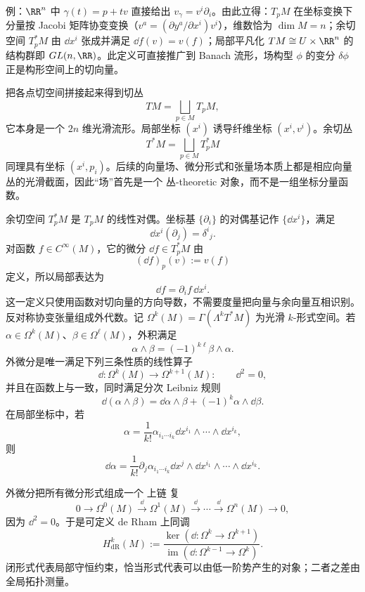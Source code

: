 例：$\RR^n$ 中 $\gamma(t)=p+tv$ 直接给出 $v_\gamma=v^i\partial_i$。由此立得：$T_pM$ 在坐标变换下分量按 Jacobi 矩阵协变变换（$v^a=(\partial y^a/\partial x^i)v^i$），维数恰为 $\dim M=n$；余切空间 $T_p^*M$ 由 $\dd x^i$ 张成并满足 $\dd f(v)=v(f)$；局部平凡化 $TM\cong U\times\RR^n$ 的结构群即 $GL(n,\RR)$。此定义可直接推广到 Banach 流形，场构型 $\phi$ 的变分 $\delta\phi$ 正是构形空间上的切向量。

把各点切空间拼接起来得到切丛
\[
TM=\bigsqcup_{p\in M}T_pM,
\]
它本身是一个 $2n$ 维光滑流形。局部坐标 $(x^i)$ 诱导纤维坐标 $(x^i,v^i)$。余切丛
\[
T^*M=\bigsqcup_{p\in M}T_p^*M
\]
同理具有坐标 $(x^i,p_i)$。后续的向量场、微分形式和张量场本质上都是相应向量丛的光滑截面，因此“场”首先是一个 丛-theoretic 对象，而不是一组坐标分量函数。

余切空间 $T_p^*M$ 是 $T_pM$ 的线性对偶。坐标基 $\{\partial_i\}$ 的对偶基记作 $\{\dd x^i\}$，满足
\[
\dd x^i(\partial_j)=\delta^i{}_j.
\]
对函数 $f\in C^\infty(M)$，它的微分 $\dd f\in T_p^*M$ 由
\begin{equation}\label{eq:math-dg-differential-function}
(\dd f)_p(v):=v(f)
\end{equation}
定义，所以局部表达为
\[
\dd f=\partial_i f\,\dd x^i.
\]
这一定义只使用函数对切向量的方向导数，不需要度量把向量与余向量互相识别。
反对称协变张量组成外代数。记 $\Omega^k(M)=\Gamma(\Lambda^kT^*M)$ 为光滑 $k$-形式空间。若 $\alpha\in\Omega^k(M)$、$\beta\in\Omega^\ell(M)$，外积满足
\[
\alpha\wedge\beta=(-1)^{k\ell}\beta\wedge\alpha.
\]
外微分是唯一满足下列三条性质的线性算子
\begin{equation*}\dd:\Omega^k(M)\longrightarrow\Omega^{k+1}(M):
\qquad
\dd^2=0,
\end{equation*}
并且在函数上与一致，同时满足分次 Leibniz 规则
\[
\dd(\alpha\wedge\beta)
=\dd\alpha\wedge\beta+(-1)^k\alpha\wedge\dd\beta.
\]
在局部坐标中，若
\[
\alpha=\frac{1}{k!}\alpha_{i_1\cdots i_k}
\dd x^{i_1}\wedge\cdots\wedge\dd x^{i_k},
\]
则
\[
\dd\alpha
=\frac{1}{k!}\partial_j\alpha_{i_1\cdots i_k}
\dd x^j\wedge\dd x^{i_1}\wedge\cdots\wedge\dd x^{i_k}.
\]

外微分把所有微分形式组成一个 上链 复
\begin{equation*}0\longrightarrow\Omega^0(M)
\overset{\dd}{\longrightarrow}\Omega^1(M)
\overset{\dd}{\longrightarrow}\cdots
\overset{\dd}{\longrightarrow}\Omega^n(M)
\longrightarrow0,\end{equation*}
因为 $\dd^2=0$。于是可定义 de Rham 上同调
\begin{equation*}H^k_{\mathrm{dR}}(M)
:=\frac{\ker(\dd:\Omega^k\to\Omega^{k+1})}
{\operatorname{im}(\dd:\Omega^{k-1}\to\Omega^k)}.\end{equation*}
闭形式代表局部守恒约束，恰当形式代表可以由低一阶势产生的对象；二者之差由全局拓扑测量。

